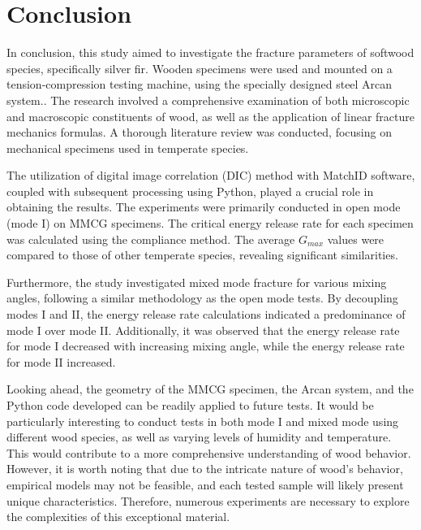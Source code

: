 
\chapter{Conclusion} %

\label{Conclusion} %


In conclusion, this study aimed to investigate the fracture parameters of softwood species, specifically silver fir. Wooden specimens were used and mounted on a tension-compression testing machine, using the specially designed steel Arcan system.. The research involved a comprehensive examination of both microscopic and macroscopic constituents of wood, as well as the application of linear fracture mechanics formulas. A thorough literature review was conducted, focusing on mechanical specimens used in temperate species.

The utilization of digital image correlation (DIC) method with MatchID software, coupled with subsequent processing using Python, played a crucial role in obtaining the results. The experiments were primarily conducted in open mode (mode I) on MMCG specimens. The critical energy release rate for each specimen was calculated using the compliance method. The average $G_{max}$ values were compared to those of other temperate species, revealing significant similarities.

Furthermore, the study investigated mixed mode fracture for various mixing angles, following a similar methodology as the open mode tests. By decoupling modes I and II, the energy release rate calculations indicated a predominance of mode I over mode II. Additionally, it was observed that the energy release rate for mode I decreased with increasing mixing angle, while the energy release rate for mode II increased.

Looking ahead, the geometry of the MMCG specimen, the Arcan system, and the Python code developed can be readily applied to future tests. It would be particularly interesting to conduct tests in both mode I and mixed mode using different wood species, as well as varying levels of humidity and temperature. This would contribute to a more comprehensive understanding of wood behavior. However, it is worth noting that due to the intricate nature of wood's behavior, empirical models may not be feasible, and each tested sample will likely present unique characteristics. Therefore, numerous experiments are necessary to explore the complexities of this exceptional material.